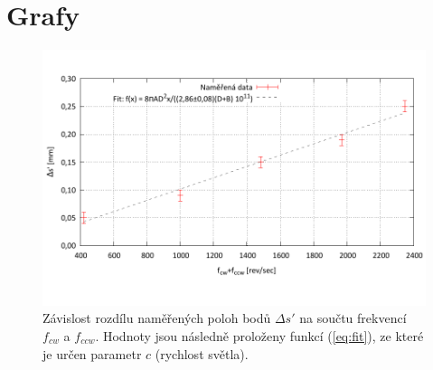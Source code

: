 \documentclass[english]{article}
\begin{document}
\section{Grafy}

	\begin{figure}[h!]
	\begin{center}
	    \vspace*{-1cm}
		\includegraphics[width=\linewidth]{../gnuplot/c.pdf}
	    \vspace*{-2cm}
		\caption{Závislost rozdílu naměřených poloh bodů $\Delta s'$ na součtu frekvencí $f_{cw}$ a $f_{ccw}$. Hodnoty jsou následně proloženy funkcí (\ref{eq:fit}), ze které je určen parametr $c$ (rychlost světla). }
		\label{fig:g_data}
	\end{center}
	\end{figure}
	

					
\end{document}
